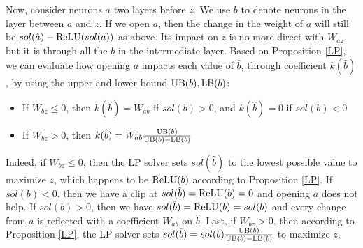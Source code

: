 % 			

\medskip

Now, consider neurons $a$ two layers before $z$. We use $b$ to denote neurons in the layer between $a$ and $z$. If we open $a$, then the change in the weight of $a$ will still be $sol(\hat{a})-\mathrm{ReLU}(sol(a))$ as above. Its impact on $z$ is no more direct with $W_{az}$, but it is through all the $b$ in the intermediate layer. 
Based on Proposition \ref{LP}, we can evaluate how opening $a$ impacts each value of 
$\hat{b}$, through coefficient $k(\hat{b})$, by using the upper and lower bound
$\mathrm{UB}(b),\mathrm{LB}(b)$:
\begin{itemize}
 \item If $W_{bz}\leq0$, then $k(\hat{b})=W_{ab}$ if $sol(b) > 0$, and $k(\hat{b})=0$ if $sol(b) < 0$
 \item If $W_{bz}>0$, then $k(\hat{b})=W_{ab} \frac{\mathrm{UB}(b)}{\mathrm{UB}(b)-\mathrm{LB}(b)}$
\end{itemize}

Indeed, if $W_{bz}\leq0$, then the LP solver sets $sol(\hat{b})$ to the lowest possible value to maximize $z$, which happens to be $\mathrm{ReLU}(b)$ according to Proposition \ref{LP}.
If $sol(b) < 0$, then we have a clip at $sol(\hat{b})=\mathrm{ReLU}(b)=0$ and opening $a$ does not help. If $sol(b) > 0$, then we have $sol(\hat{b})=\mathrm{ReLU}(b)=sol(b)$ and every change from 
$a$ is reflected with a coefficient $W_{ab}$ on $\hat{b}$. 
Last, if $W_{bz}>0$, then according to Proposition \ref{LP}, the LP solver
sets $sol(\hat{b}) = sol(b) \frac{\mathrm{UB}(b)}{\mathrm{UB}(b)-\mathrm{LB}(b)}$ to maximize $z$.


